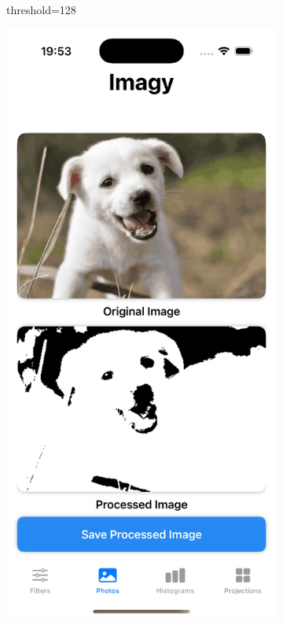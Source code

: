 \documentclass[a4paper]{article}
\begin{document}
\begin{figure}[H]
\begin{subfigure}{0.2\textwidth}
        \caption{threshold=128}
        \label{fig:dog_binary_128}
    \end{subfigure}
    \hfill
    \begin{subfigure}{0.2\textwidth}
        \centering
        \includegraphics[width=\linewidth]{images/dog_binary_87.png}

\end{subfigure}
\end{figure}
\end{document}

